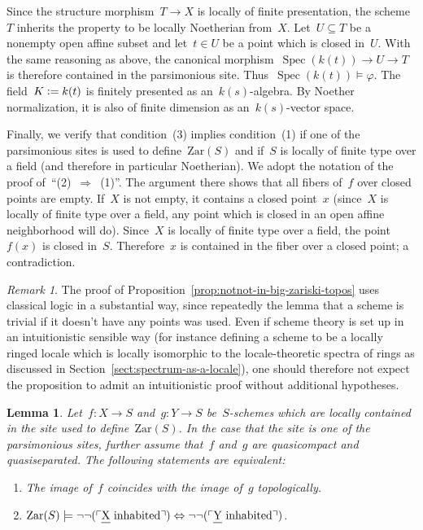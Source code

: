 \documentclass[10pt,reqno,a4paper]{amsbook}
\makeatletter
\theoremstyle{definition}
\theoremstyle{plain}
\newtheorem{lemma}[defn]{Lemma}
\theoremstyle{remark}
\newtheorem{rem}[defn]{Remark}
\let\oldul\ul
\renewcommand{\ul}[1]{\text{\oldul{$#1$}}}
\newcommand{\Zar}{\mathrm{Zar}}
\DeclareMathOperator{\Spec}{Spec}
\newcommand{\?}{\,{:}\,}
\renewcommand{\_}{\mathpunct{.}\,}
\newcommand{\speak}[1]{\ulcorner\text{\textnormal{#1}}\urcorner}
\newcommand{\defeq}{\vcentcolon=}
\renewenvironment{proof}[1][\proofname]{\par
  \pushQED{\qed}%
  \normalfont \topsep6\p@\@plus6\p@\relax
  \trivlist
  \item[\hskip\labelsep
        \itshape
    #1\@addpunct{.}]\ignorespaces
}{%
  \popQED\endtrivlist\@endpefalse
}
\makeatother
\begin{document}
\begin{proof}
Since the structure morphism~$T \to X$ is locally of finite presentation, the
scheme~$T$ inherits the property to be locally Noetherian from~$X$. Let~$U
\subseteq T$ be a nonempty open affine subset and let~$t \in U$ be a point
which is closed in~$U$. With the same reasoning as above, the canonical
morphism~$\Spec(k(t)) \to U \to T$ is therefore contained in the parsimonious
site. Thus~$\Spec(k(t)) \models \varphi$. The field~$K \defeq k(t)$ is finitely
presented as an~$k(s)$-algebra. By Noether normalization, it is also of finite
dimension as an~$k(s)$-vector space.

Finally, we verify that condition~(3) implies condition~(1) if one of the
parsimonious sites is used to define~$\Zar(S)$ and if~$S$ is locally
of finite type over a field (and therefore in particular Noetherian). We adopt
the notation of the proof of~``(2)~$\Rightarrow$~(1)''. The argument there
shows that all fibers of~$f$ over closed points are empty. If~$X$ is not empty,
it contains a closed point~$x$ (since~$X$ is locally of finite type over a field,
any point which is closed in an open affine neighborhood will do). Since~$X$
is locally of finite type over a field, the point~$f(x)$ is closed in~$S$.
Therefore~$x$ is contained in the fiber over a closed point; a contradiction.
\end{proof}

\begin{rem}The proof of Proposition~\ref{prop:notnot-in-big-zariski-topos} uses
classical logic in a substantial way, since repeatedly the lemma that a scheme
is trivial if it doesn't have any points was used. Even if scheme theory is
set up in an intuitionistic sensible way (for instance defining a scheme to be
a locally ringed locale which is locally isomorphic to the locale-theoretic
spectra of rings as discussed in Section~\ref{sect:spectrum-as-a-locale}), one
should therefore not expect the proposition to admit an intuitionistic proof
without additional hypotheses.
\end{rem}

\begin{lemma}\label{lemma:image-coincides}
Let~$f : X \to S$ and~$g : Y \to S$ be~$S$-schemes which are locally contained
in the site used to define~$\Zar(S)$. In the case that the site is one of the
parsimonious sites, further assume that~$f$ and~$g$ are quasicompact and quasiseparated.
The following statements are equivalent:
\begin{enumerate}
\item The image of~$f$ coincides with the image of~$g$ topologically.
\item $\Zar(S) \models \neg\neg(\speak{$\ul{X}$ inhabited}) \Leftrightarrow
  \neg\neg(\speak{$\ul{Y}$ inhabited})$.
\end{enumerate}
\end{lemma}
\end{document}
